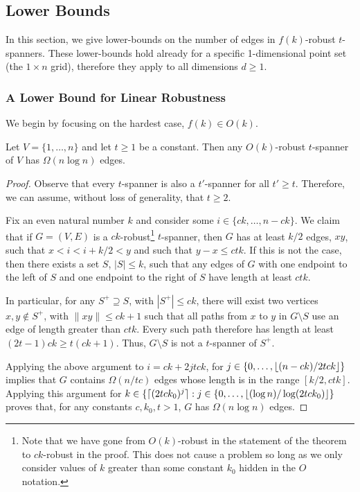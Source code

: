 \documentclass{cccg12}
\begin{document}
\subsection{Lower Bounds}

In this section, we give lower-bounds on the number of edges in
$f(k)$-robust $t$-spanners.  These lower-bounds hold already for a
specific 1-dimensional point set (the $1\times n$ grid), therefore they
apply to all dimensions $d\ge 1$.

\subsubsection{A Lower Bound for Linear Robustness}

We begin by focusing on the hardest case, $f(k) \in O(k)$.

\begin{thm}
  Let $V=\{1,\ldots,n\}$ and let $t\ge 1$ be a constant.  Then any
  $O(k)$-robust $t$-spanner of $V$ has $\Omega(n\log n)$ edges.
\end{thm}

\begin{proof}
  Observe that every $t$-spanner is also a $t'$-spanner for all $t'\ge t$.
  Therefore, we can assume, without loss of generality, that $t\ge 2$.

  Fix an even natural number $k$ and consider some
  $i\in\{ck,\ldots,n-ck\}$.  We claim that if $G=(V,E)$ is a
  $ck$-robust\footnote{Note that we have gone from $O(k)$-robust in the
  statement of the theorem to $ck$-robust in the proof.  This does not
  cause a problem so long as we only consider values of $k$ greater
  than some constant $k_0$ hidden in the $O$ notation.} $t$-spanner,
  then $G$ has at least $k/2$ edges, $xy$, such that $x < i < i+k/2 <
  y$ and such that $y-x \le ctk$.  If this is not the case, then there
  exists a set $S$, $|S|\le k$, such that any edges of $G$ with one
  endpoint to the left of $S$ and one endpoint to the right of $S$
  have length at least $ctk$.

  In particular, for any $S^+\supseteq S$, with $|S^+|\le ck$, there will
  exist two vertices $x,y\not\in S^+$, with $\|xy\|\le ck+1$ such that all
  paths from $x$ to $y$ in $G\setminus S$ use an edge of length greater
  than $ctk$. Every such path therefore has length at least $(2t-1)ck\ge
  t(ck+1)$.  Thus, $G\setminus S$ is not a $t$-spanner of $S^+$.

  Applying the above argument to $i=ck+2jtck$, for
  $j\in\{0,\ldots,{\lfloor (n-ck)/2tck \rfloor}\}$ implies that $G$ contains
  $\Omega(n/tc)$ edges whose length is in the range $[k/2,ctk]$.
  Applying this argument for $k\in\{{\lceil (2tck_0)^{j} \rceil} :
  j\in\{0,\ldots,{\lfloor (\log n)/\log(2tck_0) \rfloor}\}$ proves that, for any
  constants $c,k_0,t>1$, $G$ has $\Omega(n\log n)$ edges.
\end{proof}
\end{document}
